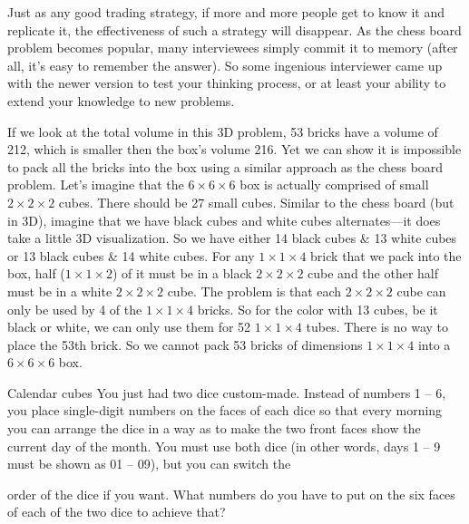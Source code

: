 \begin{solution}
Just as any good trading strategy, if more and more people get to know it and replicate it, the
effectiveness of such a strategy will disappear. As the chess board problem becomes popular,
many interviewees simply commit it to memory (after all, it's easy to remember the answer). So
some ingenious interviewer came up with the newer version to test your thinking process, or at
least your ability to extend your knowledge to new problems.

If we look at the total volume in this 3D problem, 53 bricks have a volume of 212, which is
smaller then the box's volume 216. Yet we can show it is impossible to pack all the bricks into
the box using a similar approach as the chess board problem. Let's imagine that the \(6\times6\times6\)
box is actually comprised of small \(2\times2\times2\) cubes. There should be 27 small cubes.
Similar to the chess board (but in 3D), imagine that we have black cubes and white cubes
alternates---it does take a little 3D visualization. So we have either 14 black cubes \& 13 white
cubes or 13 black cubes \& 14 white cubes. For any \(1\times1\times4\) brick that we pack into the
box, half (\(1\times1\times2\)) of it must be in a black \(2\times2\times2\) cube and the other
half must be in a white \(2\times2\times2\) cube. The problem is that each \(2\times2\times2\)
cube can only be used by 4 of the \(1\times1\times4\) bricks. So for the color with 13 cubes,
be it black or white, we can only use them for 52 \(1\times1\times4\) tubes. There is no way to
place the 53th brick. So we cannot pack 53 bricks of dimensions \(1\times1\times4\) into a
\(6\times6\times6\) box.

\end{solution}

\begin{problem}{Calendar cubes}
You just had two dice custom-made. Instead of numbers 1 -- 6, you place single-digit numbers
on the faces of each dice so that every morning you can arrange the dice in a way as to make the
two front faces show the current day of the month. You must use both dice (in other words, days
1 -- 9 must be shown as 01 -- 09), but you can switch the

order of the dice if you want. What numbers do you have to put on the six faces of each of the two
dice to achieve that?
\end{problem}

